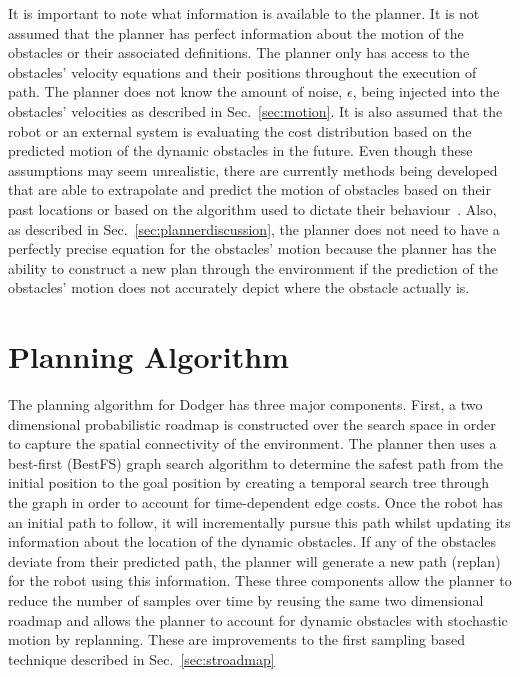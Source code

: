 It is important to note what information is available to the planner. It is not
assumed that the planner has perfect information about the motion of the
obstacles or their associated definitions. The planner only has access to the
obstacles' velocity equations and their positions throughout the execution of
path.  The planner does not know the amount of noise, $\epsilon$, being
injected into the obstacles' velocities as described in Sec.~\ref{sec:motion}.
It is also assumed that the robot or an external system is evaluating the cost
distribution based on the predicted motion of the dynamic obstacles in the
future. Even though these assumptions may seem unrealistic, there are currently
methods being developed that are able to extrapolate and predict the motion of
obstacles based on their past locations or based on the algorithm used to
dictate their behaviour~\cite{rus, cmu, boulder, edi1, edi2, keeper}. Also, as
described in Sec.~\ref{sec:plannerdiscussion}, the planner does not need to
have a perfectly precise equation for the obstacles' motion because the planner
has the ability to construct a new plan through the environment if the
prediction of the obstacles' motion does not accurately depict where the
obstacle actually is.

\section{Planning Algorithm}

\label{sec:design_planner}

The planning algorithm for Dodger has three major components. First, a two
dimensional probabilistic roadmap is constructed over the search space in order
to capture the spatial connectivity of the environment. The planner then uses a
best-first (BestFS) graph search algorithm to determine the safest path from
the initial position to the goal position by creating a temporal search tree
through the graph in order to account for time-dependent edge costs. Once the
robot has an initial path to follow, it will incrementally pursue this path
whilst updating its information about the location of the dynamic obstacles. If
any of the obstacles deviate from their predicted path, the planner will
generate a new path (replan) for the robot using this information. These three
components allow the planner to reduce the number of samples over time by
reusing the same two dimensional roadmap and allows the planner to account for
dynamic obstacles with stochastic motion by replanning. These are improvements
to the first sampling based technique described in Sec.~\ref{sec:stroadmap}

